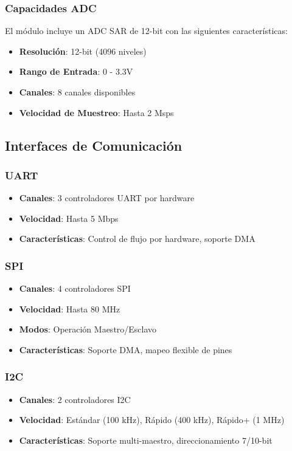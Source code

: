 \documentclass[11pt,a4paper]{article}
\begin{document}
\subsubsection{Capacidades ADC}

El módulo incluye un ADC SAR de 12-bit con las siguientes características:

\begin{itemize}
\item \textbf{Resolución}: 12-bit (4096 niveles)
\item \textbf{Rango de Entrada}: 0 - 3.3V
\item \textbf{Canales}: 8 canales disponibles
\item \textbf{Velocidad de Muestreo}: Hasta 2 Msps
\end{itemize}

\subsection{Interfaces de Comunicación}

\subsubsection{UART}
\begin{itemize}
\item \textbf{Canales}: 3 controladores UART por hardware
\item \textbf{Velocidad}: Hasta 5 Mbps
\item \textbf{Características}: Control de flujo por hardware, soporte DMA
\end{itemize}

\subsubsection{SPI}
\begin{itemize}
\item \textbf{Canales}: 4 controladores SPI
\item \textbf{Velocidad}: Hasta 80 MHz
\item \textbf{Modos}: Operación Maestro/Esclavo
\item \textbf{Características}: Soporte DMA, mapeo flexible de pines
\end{itemize}

\subsubsection{I2C}
\begin{itemize}
\item \textbf{Canales}: 2 controladores I2C
\item \textbf{Velocidad}: Estándar (100 kHz), Rápido (400 kHz), Rápido+ (1 MHz)
\item \textbf{Características}: Soporte multi-maestro, direccionamiento 7/10-bit
\end{itemize}
\end{document}
